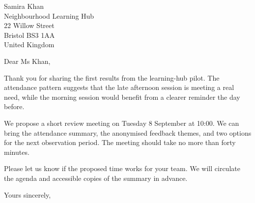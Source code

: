 \documentclass[a4paper,11pt]{myletter}
\begin{document}
\begin{letter}{Samira Khan\\Neighbourhood Learning Hub\\22 Willow Street\\Bristol BS3 1AA\\United Kingdom}
\opening{Dear Ms Khan,}

Thank you for sharing the first results from the learning-hub pilot.  The
attendance pattern suggests that the late afternoon session is meeting a real
need, while the morning session would benefit from a clearer reminder the day
before.

We propose a short review meeting on Tuesday 8 September at 10:00.  We can
bring the attendance summary, the anonymised feedback themes, and two options
for the next observation period.  The meeting should take no more than forty
minutes.

Please let us know if the proposed time works for your team.  We will circulate
the agenda and accessible copies of the summary in advance.

\closing{Yours sincerely,}
\end{letter}
\end{document}
